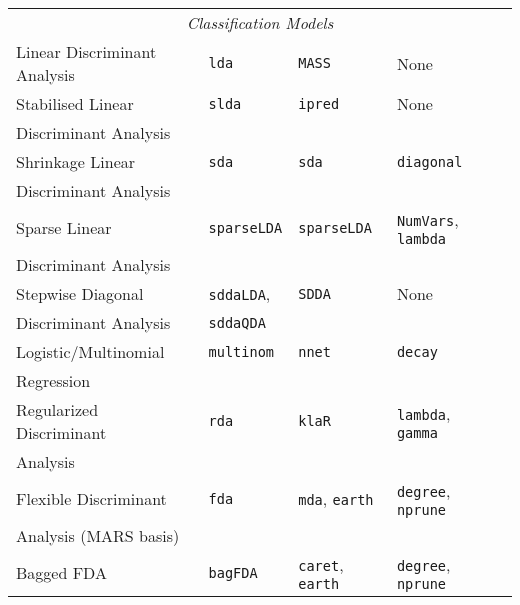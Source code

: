 \documentclass[12pt]{article}
\begin{document}
\begin{longtable}{lllll}
\multicolumn{5}{c}{{{\em Classification Models}}} \\ 
      Linear Discriminant Analysis &
         \texttt{lda} & 
            \texttt{MASS}       &          
            None\\  
 
      Stabilised Linear &
         \texttt{slda} & 
            \texttt{ipred}       &          
            None\\  
      \:\: Discriminant Analysis & & &\\            
            
      Shrinkage Linear &
         \texttt{sda} & 
            \texttt{sda}       &          
            \texttt{diagonal}\\  
      \:\: Discriminant Analysis & & &\\
      
      Sparse Linear &
         \texttt{sparseLDA} & 
            \texttt{sparseLDA}       &          
            \texttt{NumVars}, \texttt{lambda} \\  
      \:\: Discriminant Analysis & & &\\      
      
      Stepwise Diagonal &
        \texttt{sddaLDA}, &
        \texttt{SDDA} &
        None \\
      \:\: Discriminant Analysis & \texttt{sddaQDA} & &\\
            
      Logistic/Multinomial  &
         \texttt{multinom} & 
            \texttt{nnet}       & 
            \texttt{decay}& \\   
      \: \: Regression \\ 
                     
      Regularized Discriminant  &
         \texttt{rda} & 
            \texttt{klaR}       & 
            \texttt{lambda}, \texttt{gamma} & \\*
      \: \: Analysis \\*
      
      Flexible Discriminant  &
         \texttt{fda} & 
            \texttt{mda}, \texttt{earth}       & 
            \texttt{degree}, \texttt{nprune} & \\
      \: \: Analysis (MARS basis)\\      
      
      Bagged FDA &
         \texttt{bagFDA} & 
            \texttt{caret},  \texttt{earth}       & 
            \texttt{degree}, \texttt{nprune} \\   
            

\end{longtable}
\end{document}
